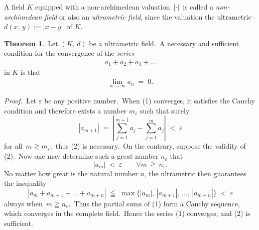 \documentclass[12pt]{article}
\theoremstyle{definition}
\newtheorem*{thmplain}{Theorem}
\begin{document}
A field $K$ equipped with a non-archimedean valuation\, $|\cdot|$\, is called a {\em non-archimedean field} or also an {\em ultrametric field}, since the valuation  the ultrametric\, $d(x,\,y) := |x\!-\!y|$\, of $K$.\\

\begin{thmplain}
\,Let $(K,\,d)$ be a  ultrametric field.\, A necessary and sufficient condition for the convergence of the {\em series} 
\begin{align}
                 a_1\!+\!a_2\!+\!a_3\!+\ldots
\end{align}
in $K$ is that
\begin{align}
                \lim_{n\to\infty}a_n \;=\; 0.
\end{align}
\end{thmplain}

{\em Proof.}\, Let $\varepsilon$ be any positive number.\, When (1) converges, it satisfies the Cauchy condition and therefore exists a number $m_\varepsilon$ such that surely
 $$|a_{m+1}| \;=\; \left|\sum_{j=1}^{m+1}a_j-\sum_{j=1}^{m}a_j\right| \;<\; \varepsilon$$
for all\, $m \geqq m_\varepsilon$;\, thus (2) is necessary.\, On the contrary, suppose the validity of (2).\, Now one may determine such a great number $n_\varepsilon$ that 
      $$|a_m| \;<\; \varepsilon \qquad \forall m \,\geqq\, n_\varepsilon.$$
No matter how great is the natural number $n$, the ultrametric then guarantees the inequality
  $$|a_m\!+\!a_{m+1}\!+\ldots+\!a_{m+n}| \;\leqq\; 
\max\{|a_m|,\,|a_{m+1}|,\,\ldots,\,|a_{m+n}|\} \;<\; \varepsilon$$
always when\, $m \geqq n_\varepsilon$.\, Thus the partial sums of (1) form a Cauchy sequence, which converges in the complete field.\, Hence the series (1) converges, and (2) is sufficient.

\end{document}
